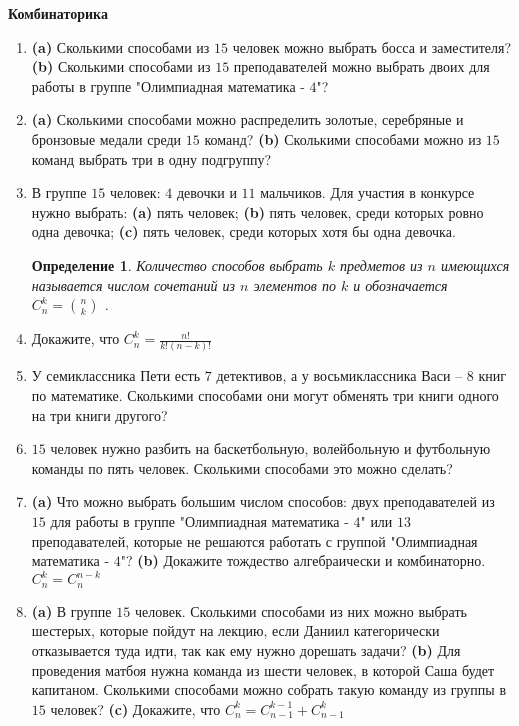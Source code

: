 \documentclass{article}
\newtheorem{definition}{Определение}
\begin{document}
\large
	
\begin{center}
	\textbf{Комбинаторика}
\end{center}

\begin{enumerate}[label*=\protect\fbox{\arabic{enumi}}]
	
\item \textbf{(a)} Сколькими способами из $15$ человек можно выбрать босса и заместителя? \textbf{(b)} Сколькими способами из $15$ преподавателей можно выбрать двоих для работы в группе "Олимпиадная математика - $4$"?

\item \textbf{(a)} Сколькими способами можно распределить золотые, серебряные и бронзовые медали среди $15$ команд? \textbf{(b)} Сколькими способами можно из $15$ команд выбрать три в одну подгруппу?

\item В группе $15$ человек: $4$ девочки и $11$ мальчиков. Для участия в конкурсе нужно выбрать: \textbf{(a)} пять человек; \textbf{(b)} пять человек, среди которых ровно одна девочка; \textbf{(c)} пять человек, среди которых хотя бы одна девочка. 

\begin{definition}
	Количество способов выбрать $k$ предметов из $n$ имеющихся называется числом сочетаний из $n$ элементов по $k$ и обозначается $C^k_n = \binom{n}{k}$ .
\end{definition}

\item Докажите, что $C^k_n = \frac{n!}{k!(n - k)!}$

\item У семиклассника Пети есть $7$ детективов, а у восьмиклассника Васи – $8$ книг по математике. Сколькими способами они могут обменять три книги одного на три книги другого?

\item $15$ человек нужно разбить на баскетбольную, волейбольную и футбольную команды по пять человек. Сколькими способами это можно сделать?

\item \textbf{(a)} Что можно выбрать большим числом способов: двух преподавателей из $15$ для работы
в группе "Олимпиадная математика - $4$" или $13$ преподавателей, которые не решаются работать с группой "Олимпиадная математика - $4$"? \textbf{(b)} Докажите тождество алгебраически и комбинаторно. $C^k_n = C^{n-k}_n$

\item \textbf{(a)} В группе $15$ человек. Сколькими способами из них можно выбрать шестерых, которые пойдут на лекцию, если Даниил категорически отказывается туда идти, так как ему нужно дорешать задачи? \textbf{(b)} Для проведения матбоя нужна команда из шести человек, в которой Саша будет капитаном. Сколькими способами можно собрать такую команду из группы в $15$ человек? \textbf{(c)} Докажите, что $C^k_n = C^{k-1}_{n - 1} + C^k_{n- 1}$


\end{enumerate}
\end{document}
